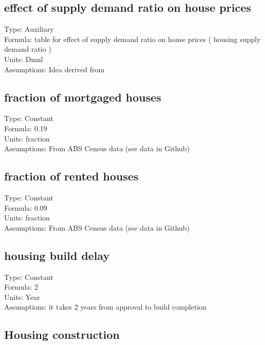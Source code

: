 \documentclass[
  11pt,
]{book}
\begin{document}
\hypertarget{effect-of-supply-demand-ratio-on-house-prices}{%
\subsection{effect of supply demand ratio on house prices}\label{effect-of-supply-demand-ratio-on-house-prices}}

Type: Auxiliary\\
Formula: table for effect of supply demand ratio on house prices ( housing supply demand ratio )\\
Units: Dmnl\\
Assumptions: Idea derived from \citet{ozbas_modeling_2014}

\hypertarget{fraction-of-mortgaged-houses}{%
\subsection{fraction of mortgaged houses}\label{fraction-of-mortgaged-houses}}

Type: Constant\\
Formula: 0.19\\
Units: fraction\\
Assumptions: From ABS Census data (see data in Github)

\hypertarget{fraction-of-rented-houses}{%
\subsection{fraction of rented houses}\label{fraction-of-rented-houses}}

Type: Constant\\
Formula: 0.09\\
Units: fraction\\
Assumptions: From ABS Census data (see data in Github)

\hypertarget{housing-build-delay}{%
\subsection{housing build delay}\label{housing-build-delay}}

Type: Constant\\
Formula: 2\\
Units: Year\\
Assumptions: it takes 2 years from approval to build completion

\hypertarget{housing-construction}{%
\subsection{Housing construction}\label{housing-construction}}
\end{document}
